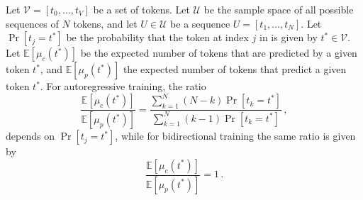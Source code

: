 \begin{proposition}
\label{prop-counting-prediction-context}
%
Let $\mathcal{V} = [t_0, \dots, t_V]$ be a set of tokens.
%
Let $\mathcal{U}$ be the sample space of all possible sequences of $N$ tokens, and let $U\in\mathcal{U}$ be a sequence $U = [t_1, \dots, t_N]$.
%
Let $\Pr[t_j = t^*]$ be the probability that the token at index $j$ in is given by $t^* \in \mathcal{V}$.
%
Let $\mathbb{E}[\mu_c(t^*)]$ be the expected number of tokens that are predicted by a given token $t^*$, and $\mathbb{E}[\mu_p(t^*)]$ the expected number of tokens that predict a given token $t^*$.
%
For autoregressive training, the ratio
%
\begin{equation}
    \frac{\mathbb{E}[\mu_c(t^*)]}{\mathbb{E}[\mu_p(t^*)]} = \frac{\sum_{k=1}^N (N-k)\Pr[t_k = t^*]}{\sum_{k=1}^N(k-1)\Pr[t_k = t^*]} \,,
\end{equation}
%
depends on $\Pr[t_j = t^*]$, while for bidirectional training the same ratio is given by 
%
\begin{equation}
     \frac{\mathbb{E}[\mu_c(t^*)]}{\mathbb{E}[\mu_p(t^*)]} = 1 \,.
\end{equation}
%    
\end{proposition}